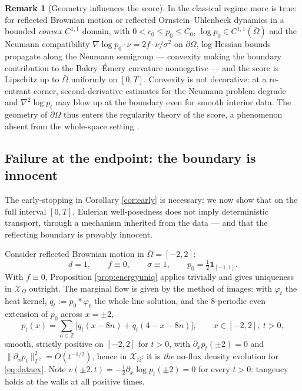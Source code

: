 \documentclass[11pt]{amsart}
\theoremstyle{definition}
\newtheorem{remark}[theorem]{Remark}
\begin{document}
\begin{remark}[Geometry influences the score]\label{rem:convex}
In the classical regime more is true: for reflected Brownian motion
or reflected Ornstein--Uhlenbeck dynamics in a bounded \emph{convex}
$C^{1,1}$ domain, with $0<c_0\le p_0\le C_0$, $\log p_0\in
C^{1,1}(\bar\Omega)$ and the Neumann compatibility
$\nabla\log p_0\cdot\nu=2f\cdot\nu/\sigma^2$ on $\partial\Omega$,
log-Hessian bounds propagate along the Neumann semigroup ---
convexity making the boundary contribution to the Bakry--\'Emery
curvature nonnegative \cite{Wang} --- and the score is Lipschitz up
to $\bar\Omega$ uniformly on $[0,T]$. Convexity is not decorative:
at a re-entrant corner, second-derivative estimates for the Neumann
problem degrade and $\nabla^2\log p_t$ may blow up at the boundary
even for smooth interior data. The geometry of $\partial\Omega$ thus
enters the regularity theory of the score, a phenomenon absent from
the whole-space setting \cite{pfode}.
\end{remark}

\subsection{Failure at the endpoint: the boundary is innocent}
\label{subsec:dataex}

The early-stopping in Corollary \ref{cor:early} is necessary: we now
show that on the full interval $[0,T]$, Eulerian well-posedness does
not imply deterministic transport, through a mechanism inherited from
the data --- and that the reflecting boundary is provably innocent.

Consider reflected Brownian motion in $\bar\Omega=[-2,2]$:
\begin{equation}\label{eq:dataex}
d=1,\qquad f\equiv0,\qquad\sigma\equiv1,\qquad
p_0=\tfrac12\mathbf{1}_{[-1,1]} .
\end{equation}
With $f\equiv0$, Proposition \ref{prop:energyuniq} applies trivially
and gives uniqueness in $\mathcal{X}_\Omega$ outright. The marginal
flow is given by the method of images: with $\varphi_t$ the heat
kernel, $q_t:=p_0*\varphi_t$ the whole-line solution, and the
$8$-periodic even extension of $p_0$ across $x=\pm2$,
\begin{equation}\label{eq:images}
p_t(x)=\sum_{n\in\mathbb{Z}}\Big[q_t(x-8n)+q_t(4-x-8n)\Big],
\qquad x\in[-2,2],\ t>0,
\end{equation}
smooth, strictly positive on $[-2,2]$ for $t>0$, with
$\partial_xp_t(\pm2)=0$ and $\|\partial_xp_t\|_{L^2}^2=O(t^{-1/2})$,
hence in $\mathcal{X}_\Omega$: it is \emph{the} no-flux density
evolution for \eqref{eq:dataex}. Note $v(\pm2,t)=
-\tfrac12\partial_x\log p_t(\pm2)=0$ for every $t>0$: tangency holds
at the walls at all positive times.
\end{document}
